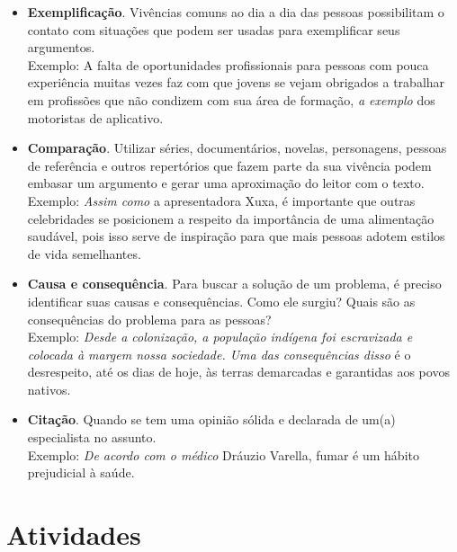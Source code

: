 {\begin{itemize}
\item \textbf{Exemplificação}. Vivências comuns ao dia a dia das pessoas possibilitam o contato com situações que podem ser usadas para exemplificar seus argumentos.\\ Exemplo: A falta de oportunidades profissionais para pessoas com pouca experiência muitas vezes faz com que jovens se vejam obrigados a trabalhar em profissões que não condizem com sua área de formação, \emph{a exemplo} dos motoristas de aplicativo.

\item \textbf{Comparação}. Utilizar séries, documentários, novelas, personagens, pessoas de referência e outros repertórios que fazem parte da sua vivência podem embasar um argumento e gerar uma aproximação do leitor com o texto.\\ Exemplo: \emph{Assim como} a apresentadora Xuxa, é importante que outras celebridades se posicionem a respeito da importância de uma alimentação saudável, pois isso serve de inspiração para que mais pessoas adotem estilos de vida semelhantes.

\item \textbf{Causa e consequência}. Para buscar a solução de um problema, é preciso identificar suas causas e consequências. Como ele surgiu? Quais são as consequências do problema para as pessoas?\\ Exemplo: \emph{Desde a colonização, a população indígena foi escravizada e colocada à margem nossa sociedade. Uma das consequências disso} é o desrespeito, até os dias de hoje, às terras demarcadas e garantidas aos povos nativos.

\item \textbf{Citação}. Quando se tem uma opinião sólida e declarada de um(a) especialista no assunto.\\ Exemplo: \emph{De acordo com o médico} Dráuzio Varella, fumar é um hábito prejudicial à saúde.
\end{itemize}}


\section*{Atividades}

\hspace\parindent{Leia o texto a seguir, publicado no Jornal da USP, e responda às
questões de 1 a 3.}



